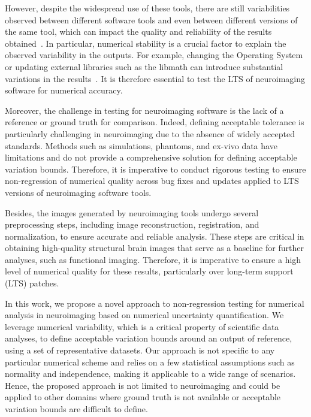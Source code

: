 \documentclass{article}
\begin{document}
However, despite the widespread use of these tools, there are still variabilities observed between different software tools and even between different versions of the same tool, which can impact the quality and reliability of the results obtained~\cite{glatard2015reproducibility, kiar2021numerical,bhagwat2021understanding}. In particular, numerical stability is a crucial factor to explain the observed variability in the outputs. For example, changing the Operating System or updating external libraries such as the libmath can introduce substantial variations in the results~\cite{salari2021accurate}. It is therefore essential to test the LTS of neuroimaging software for numerical accuracy.

Moreover, the challenge in testing for neuroimaging software is the lack of a reference or ground truth for comparison. Indeed, defining acceptable tolerance is particularly challenging in neuroimaging due to the absence of widely accepted standards. Methods such as simulations, phantoms, and ex-vivo data have limitations and do not provide a comprehensive solution for defining acceptable variation bounds. Therefore, it is imperative to conduct rigorous testing to ensure non-regression of numerical quality across bug fixes and updates applied to LTS versions of neuroimaging software tools.

Besides, the images generated by neuroimaging tools undergo several preprocessing steps, including image reconstruction, registration, and normalization, to ensure accurate and reliable analysis. These steps are critical in obtaining high-quality structural brain images that serve as a baseline for further analyses, such as functional imaging. Therefore, it is imperative to ensure a high level of numerical quality for these results, particularly over long-term support (LTS) patches.

In this work, we propose a novel approach to non-regression testing for numerical analysis in neuroimaging based on numerical uncertainty quantification. We leverage numerical variability, which is a critical property of scientific data analyses, to define acceptable variation bounds around an output of reference, using a set of representative datasets. Our approach is not specific to any particular numerical scheme and relies on a few statistical assumptions such as normality and independence, making it applicable to a wide range of scenarios. Hence, the proposed approach is not limited to neuroimaging and could be applied to other domains where ground truth is not available or acceptable variation bounds are difficult to define.
\end{document}
